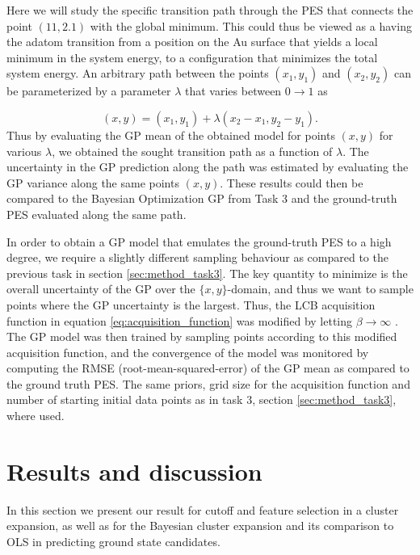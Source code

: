\documentclass[11pt,a4paper]{article}
\begin{document}
Here we will study the specific transition path through the PES that connects the point $(11,2.1)$ with the global minimum. This could thus be viewed as a having the adatom transition from a position on the Au surface that yields a local minimum in the system energy, to a configuration that minimizes the total system energy. An arbitrary path between the points $(x_1,y_1)$ and $(x_2,y_2)$ can be parameterized by a parameter $\lambda$ that varies between $0\rightarrow1$ as

\begin{equation}
    (x,y) = \left(x_1, y_1 \right ) + \lambda \left(x_2-x_1, y_2-y_1 \right).
\end{equation}
Thus by evaluating the GP mean of the obtained model for points $(x,y)$ for various $\lambda$, we obtained the sought transition path as a function of $\lambda$. The uncertainty in the GP prediction along the path was estimated by evaluating the GP variance along the same points $(x,y)$. These results could then be compared to the Bayesian Optimization GP from Task 3 and the ground-truth PES evaluated along the same path. 

In order to obtain a GP model that emulates the ground-truth PES to a high degree, we require a slightly different sampling behaviour as compared to the previous task in section \ref{sec:method_task3}. The key quantity to minimize is the overall uncertainty of the GP over the $\{x,y\}$-domain, and thus we want to sample points where the GP uncertainty is the largest. Thus, the LCB acquisition function in equation \eqref{eq:acquisition_function} was modified by letting $\beta \rightarrow \infty$ \cite{project_pm}. The GP model was then trained by sampling points according to this modified acquisition function, and the convergence of the model was monitored by computing the RMSE (root-mean-squared-error) of the GP mean as compared to the ground truth PES. The same priors, grid size for the acquisition function and number of starting initial data points as in task 3, section \ref{sec:method_task3}, where used.

\section{Results and discussion}

In this section we present our result for cutoff and feature selection in a cluster expansion, as well as for the Bayesian cluster expansion and its comparison to OLS in predicting ground state candidates. 
\end{document}

